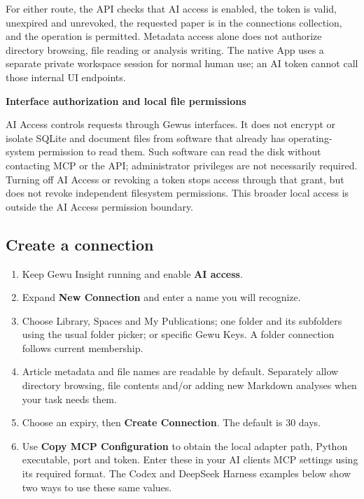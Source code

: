 \documentclass[10pt,letterpaper,oneside]{scrreprt}
\providecommand{\tightlist}{\setlength{\itemsep}{1pt}\setlength{\parskip}{0pt}}
\renewenvironment{quote}
  {\Needspace{5\baselineskip}\begin{tcolorbox}[enhanced,breakable,colback=GewuPale,colframe=GewuPale,boxrule=0pt,
    borderline west={1.6pt}{0pt}{GewuBlue},arc=1.2mm,left=2.5mm,right=2.5mm,top=1.7mm,bottom=1.7mm,
    before skip=4pt,after skip=5pt,fontupper=\color{GewuInk}\small]}
  {\end{tcolorbox}}
\begin{document}
For either route, the API checks that AI access is enabled, the token is valid, unexpired and unrevoked, the requested paper is in the connection\textquotesingle s collection, and the operation is permitted. Metadata access alone does not authorize directory browsing, file reading or analysis writing. The native App uses a separate private workspace session for normal human use; an AI token cannot call those internal UI endpoints.

\begin{quote}
\textbf{Interface authorization and local file permissions}

AI Access controls requests through Gewu\textquotesingle s interfaces. It does not encrypt or isolate SQLite and document files from software that already has operating-system permission to read them. Such software can read the disk without contacting MCP or the API; administrator privileges are not necessarily required. Turning off AI Access or revoking a token stops access through that grant, but does not revoke independent filesystem permissions. This broader local access is outside the AI Access permission boundary.
\end{quote}

\subsection{Create a connection}\label{create-a-connection}

\begin{enumerate}
\tightlist
\item
  Keep Gewu Insight running and enable \textbf{AI access}.
\item
  Expand \textbf{New Connection} and enter a name you will recognize.
\item
  Choose Library, Spaces and My Publications; one folder and its subfolders using the usual folder picker; or specific Gewu Keys. A folder connection follows current membership.
\item
  Article metadata and file names are readable by default. Separately allow directory browsing, file contents and/or adding new Markdown analyses when your task needs them.
\item
  Choose an expiry, then \textbf{Create Connection}. The default is 30 days.
\item
  Use \textbf{Copy MCP Configuration} to obtain the local adapter path, Python executable, port and token. Enter these in your AI client\textquotesingle s MCP settings using its required format. The Codex and DeepSeek Harness examples below show two ways to use these same values.
\end{enumerate}
\end{document}
